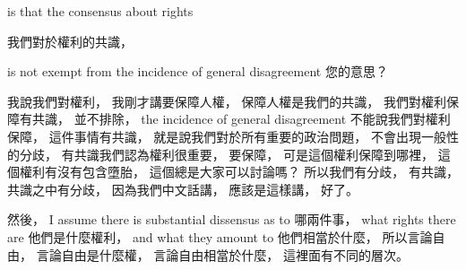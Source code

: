 \hypertarget{w06:cue:1832}{}is that the consensus about rights

\hypertarget{w06:cue:1833}{}我們對於權利的共識，

\hypertarget{w06:cue:1834}{}is not exempt from the incidence
\hypertarget{w06:cue:1835}{}of general disagreement
\hypertarget{w06:cue:1836}{}您的意思？

\hypertarget{w06:cue:1837}{}我說我們對權利，
\hypertarget{w06:cue:1838}{}我剛才講要保障人權，
\hypertarget{w06:cue:1839}{}保障人權是我們的共識，
\hypertarget{w06:cue:1840}{}我們對權利保障有共識，
\hypertarget{w06:cue:1841}{}並不排除，
\hypertarget{w06:cue:1842}{}the incidence of general disagreement
\hypertarget{w06:cue:1843}{}不能說我們對權利保障，
\hypertarget{w06:cue:1844}{}這件事情有共識，
\hypertarget{w06:cue:1845}{}就是說我們對於所有重要的政治問題，
\hypertarget{w06:cue:1846}{}不會出現一般性的分歧，
\hypertarget{w06:cue:1847}{}有共識我們認為權利很重要，
\hypertarget{w06:cue:1848}{}要保障，
\hypertarget{w06:cue:1849}{}可是這個權利保障到哪裡，
\hypertarget{w06:cue:1850}{}這個權利有沒有包含墮胎，
\hypertarget{w06:cue:1851}{}這個總是大家可以討論嗎？
\hypertarget{w06:cue:1852}{}所以我們有分歧，
\hypertarget{w06:cue:1853}{}有共識，
\hypertarget{w06:cue:1854}{}共識之中有分歧，
\hypertarget{w06:cue:1855}{}因為我們中文話講，
\hypertarget{w06:cue:1856}{}應該是這樣講，
\hypertarget{w06:cue:1857}{}好了。

\hypertarget{w06:cue:1858}{}然後，
\hypertarget{w06:cue:1859}{}I assume there is substantial
\hypertarget{w06:cue:1860}{}dissensus as to
\hypertarget{w06:cue:1861}{}哪兩件事，
\hypertarget{w06:cue:1862}{}what rights there are
\hypertarget{w06:cue:1863}{}他們是什麼權利，
\hypertarget{w06:cue:1864}{}and what they amount to
\hypertarget{w06:cue:1865}{}他們相當於什麼，
\hypertarget{w06:cue:1866}{}所以言論自由，
\hypertarget{w06:cue:1867}{}言論自由是什麼權，
\hypertarget{w06:cue:1868}{}言論自由相當於什麼，
\hypertarget{w06:cue:1869}{}這裡面有不同的層次。

